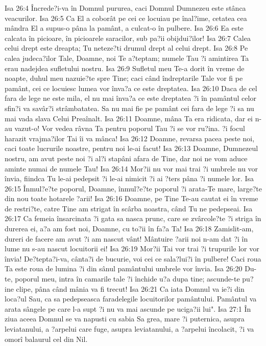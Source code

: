 Isa 26:4  Încrede?i-va în Domnul pururea, caci Domnul Dumnezeu este stânca veacurilor.
Isa 26:5  Ca El a coborât pe cei ce locuiau pe înal?ime, cetatea cea mândra El a supus-o pâna la pamânt, a culcat-o în pulbere.
Isa 26:6  Ea este calcata în picioare, în picioarele saracilor, sub pa?ii obijdui?ilor!
Isa 26:7  Calea celui drept este dreapta; Tu neteze?ti drumul drept al celui drept.
Isa 26:8  Pe calea judeca?ilor Tale, Doamne, noi Te a?teptam; numele Tau ?i amintirea Ta erau nadejdea sufletului nostru.
Isa 26:9  Sufletul meu Te-a dorit în vreme de noapte, duhul meu nazuie?te spre Tine; caci când îndreptarile Tale vor fi pe pamânt, cei ce locuiesc lumea vor înva?a ce este dreptatea.
Isa 26:10  Daca de cel fara de lege ne este mila, el nu mai înva?a ce este dreptatea ?i în pamântul celor sfin?i va savâr?i strâmbatatea. Sa nu mai fie pe pamânt cei fara de lege ?i sa nu mai vada slava Celui Preaînalt.
Isa 26:11  Doamne, mâna Ta era ridicata, dar ei n-au vazut-o! Vor vedea râvna Ta pentru poporul Tau ?i se vor ru?ina. ?i focul harazit vrajma?ilor Tai îi va mânca!
Isa 26:12  Doamne, revarsa pacea peste noi, caci toate lucrurile noastre, pentru noi le-ai facut!
Isa 26:13  Doamne, Dumnezeul nostru, am avut peste noi ?i al?i stapâni afara de Tine, dar noi ne vom aduce aminte numai de numele Tau!
Isa 26:14  Mor?ii nu vor mai trai ?i umbrele nu vor învia, fiindca Tu le-ai pedepsit ?i le-ai nimicit ?i ai ?ters pâna ?i numele lor.
Isa 26:15  Înmul?e?te poporul, Doamne, înmul?e?te poporul ?i arata-Te mare, large?te din nou toate hotarele ?arii!
Isa 26:16  Doamne, pe Tine Te-au cautat ei în vreme de restri?te, catre Tine am strigat în scârba noastra, când Tu ne pedepseai.
Isa 26:17  Ca femeia însarcinata ?i gata sa nasca prunc, care se zvârcole?te ?i striga în durerea ei, a?a am fost noi, Doamne, cu to?ii în fa?a Ta!
Isa 26:18  Zamislit-am, dureri de facere am avut ?i am nascut vânt! Mântuire ?arii noi n-am dat ?i în lume nu s-au nascut locuitorii ei!
Isa 26:19  Mor?ii Tai vor trai ?i trupurile lor vor învia! De?tepta?i-va, cânta?i de bucurie, voi cei ce sala?lui?i în pulbere! Caci roua Ta este roua de lumina ?i din sânul pamântului umbrele vor învia.
Isa 26:20  Du-te, poporul meu, intra în camarile tale ?i închide u?a dupa tine; ascunde-te pu?ine clipe, pâna când mânia va fi trecut!
Isa 26:21  Ca iata Domnul va ie?i din loca?ul Sau, ca sa pedepseasca faradelegile locuitorilor pamântului. Pamântul va arata sângele pe care l-a supt ?i nu va mai ascunde pe uciga?ii lui".
Isa 27:1  În ziua aceea Domnul se va napusti cu sabia Sa grea, mare ?i puternica, asupra leviatanului, a ?arpelui care fuge, asupra leviatanului, a ?arpelui încolacit, ?i va omorî balaurul cel din Nil.
